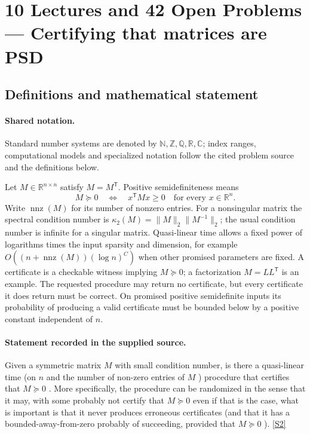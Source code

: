 \documentclass[11pt]{article}
\newcommand{\sref}[2]{\hyperlink{source:#1:#2}{[S#2]}}
\begin{document}
\section{10 Lectures and 42 Open Problems — Certifying that matrices are PSD}\label{statement}

\subsection{Definitions and mathematical statement}

\paragraph{Shared notation.}Standard number systems are denoted by $\mathbb N,\mathbb Z,\mathbb Q,\mathbb R,\mathbb C$; index ranges, computational models and specialized notation follow the cited problem source and the definitions below.


Let $M\in\mathbb{R}^{n\times n}$ satisfy $M=M^{\mathsf T}$. Positive semidefiniteness means
\[
 M\succeq0\quad\Longleftrightarrow\quad x^{\mathsf T}Mx\ge0\quad\text{for every }x\in\mathbb{R}^n.
\]
Write $\operatorname{nnz}(M)$ for its number of nonzero entries. For a nonsingular matrix the spectral condition number is $\kappa_2(M)=\|M\|_2\|M^{-1}\|_2$; the usual condition number is infinite for a singular matrix. Quasi-linear time allows a fixed power of logarithms times the input sparsity and dimension, for example $O((n+\operatorname{nnz}(M))(\log n)^C)$ when other promised parameters are fixed. A certificate is a checkable witness implying $M\succeq0$; a factorization $M=LL^{\mathsf T}$ is an example. The requested procedure may return no certificate, but every certificate it does return must be correct. On promised positive semidefinite inputs its probability of producing a valid certificate must be bounded below by a positive constant independent of $n$.
\paragraph{Statement recorded in the supplied source.}
Given a symmetric matrix ${M}$ with small condition number, is there a quasi-linear time (on ${n}$ and the number of non-zero entries of ${M}$ ) procedure that certifies that ${M\succeq 0}$ . More specifically, the procedure can be randomized in the sense that it may, with some probably not certify that ${M\succeq 0}$ even if that is the case, what is important is that it never produces erroneous certificates (and that it has a bounded-away-from-zero probably of succeeding, provided that ${M\succeq 0}$ ). \sref{statement}{2}
\end{document}
